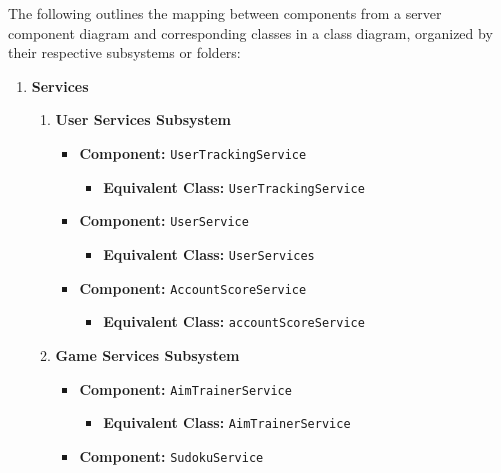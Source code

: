 \documentclass[11pt,a4paper]{article}
\begin{document}
The following outlines the mapping between components from a server component diagram and corresponding classes in a class diagram, organized by their respective subsystems or folders:
\begin{enumerate}[label=\textbf{\arabic*.}, ref=\arabic*]
    \item \textbf{Services}
        \begin{enumerate}[label=\textbf{\alph*.}, ref=\theenumi.\alph*]
            \item \textbf{User Services Subsystem}
                \begin{itemize}
                    \item \textbf{Component:} \texttt{UserTrackingService}
                        \begin{itemize}
                            \item \textbf{Equivalent Class:} \texttt{UserTrackingService}
                        \end{itemize}
                    \item \textbf{Component:} \texttt{UserService}
                        \begin{itemize}
                            \item \textbf{Equivalent Class:} \texttt{UserServices}
                        \end{itemize}
                    \item \textbf{Component:} \texttt{AccountScoreService}
                        \begin{itemize}
                            \item \textbf{Equivalent Class:} \texttt{accountScoreService}
                        \end{itemize}
                \end{itemize}
            \item \textbf{Game Services Subsystem}
                \begin{itemize}
                    \item \textbf{Component:} \texttt{AimTrainerService}
                        \begin{itemize}
                            \item \textbf{Equivalent Class:} \texttt{AimTrainerService}
                        \end{itemize}
                    \item \textbf{Component:} \texttt{SudokuService}
                        \begin{itemize}

\end{itemize}
\end{itemize}
\end{enumerate}
\end{enumerate}
\end{document}
